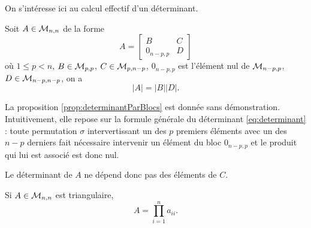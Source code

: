On s'intéresse ici au calcul effectif d'un déterminant.

\begin{proposition} \label{prop:determinantParBlocs}
  Soit $A \in \mathcal{M}_{n,n}$ de la forme
  $$
  A = \left[\begin{array}{cc}
      B & C \\ 0_{n-p, p} & D
    \end{array}\right]
  $$
  où $1 \leq p < n$, $B \in \mathcal{M}_{p, p}$, $C \in \mathcal{M}_{p, n-p}$, $0_{n-p, p}$ est l'élément nul de $\mathcal{M}_{n-p, p}$, $D \in \mathcal{M}_{n-p, n-p}$, on a
  $$
  |A| = |B| |D|.
  $$
\end{proposition}

La proposition \ref{prop:determinantParBlocs} est donnée sans démonstration. Intuitivement, elle repose sur la formule générale du déterminant \eqref{eq:determinant} : toute permutation $\sigma$ intervertissant un des $p$ premiers éléments avec un des $n-p$ derniers fait nécessaire intervenir un élément du bloc $0_{n-p, p}$ et le produit qui lui est associé est donc nul.
\eproof

\remark Le déterminant de $A$ ne dépend donc pas des éléments de $C$.

\begin{proposition} \label{prop:determinantMatriceTriangulaire}
  Si $A \in \mathcal{M}_{n,n}$ est triangulaire, 
  $$
  A = \prod_{i=1}^n a_{ii}.
  $$
\end{proposition}

